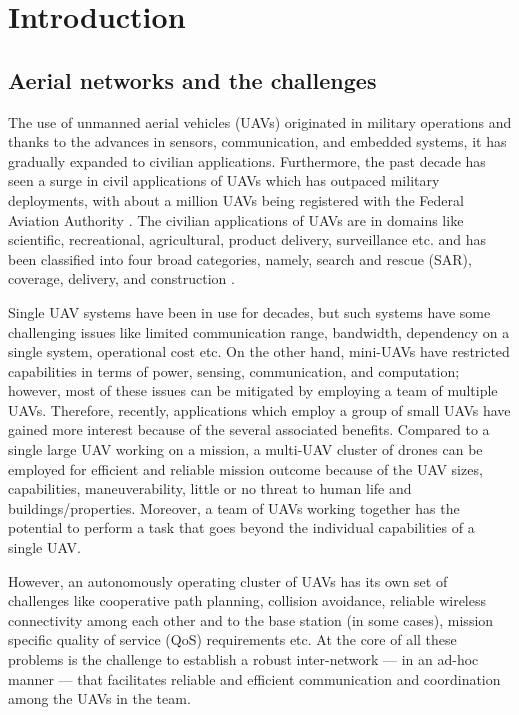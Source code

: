 \chapter{Introduction}
\label{chap-one}
\section{Aerial networks and the challenges}

The use of unmanned aerial vehicles (UAVs) originated in military operations and thanks to the advances in sensors, communication, and embedded systems, it has gradually expanded to civilian applications. Furthermore, the past decade has seen a surge in civil applications of UAVs which has outpaced military deployments, with about a million UAVs being registered with the Federal Aviation Authority \cite{mydroneservices}. The civilian applications of UAVs are in domains like scientific, recreational, agricultural, product delivery, surveillance etc. and has been classified into four broad categories, namely, search and rescue (SAR), coverage, delivery, and construction \cite{7463007}.

Single UAV systems have been in use for decades, but such systems have some challenging issues like limited communication range, bandwidth, dependency on a single system, operational cost etc. On the other hand, mini-UAVs have restricted capabilities in terms of power, sensing, communication, and computation; however, most of these issues can be mitigated by employing a team of multiple UAVs. Therefore, recently, applications which employ a group of small UAVs have gained more interest because of the several associated benefits. Compared to a single large UAV working on a mission, a multi-UAV cluster of drones can be employed for efficient and reliable mission outcome because of the UAV sizes, capabilities, maneuverability, little or no threat to human life and buildings/properties. Moreover, a team of UAVs working together has the potential to perform a task that goes beyond the individual capabilities of a single UAV. 

However, an autonomously operating cluster of UAVs has its own set of challenges like cooperative path planning, collision avoidance, reliable wireless connectivity among each other and to the base station (in some cases), mission specific quality of service (QoS) requirements etc. At the core of all these problems is the challenge to establish a robust inter-network --- in an ad-hoc manner --- that facilitates reliable and efficient communication and coordination among the UAVs in the team. 

